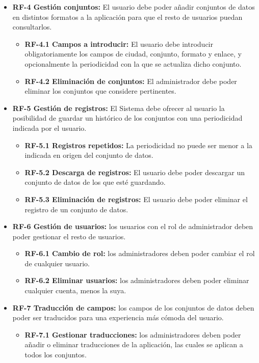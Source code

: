 \begin{itemize}
    \item \textbf{RF-4 Gestión conjuntos:} El usuario debe poder añadir conjuntos de datos en distintos formatos a la aplicación para que el resto de usuarios puedan consultarlos.
    \begin{itemize}
        \item \textbf{RF-4.1 Campos a introducir:} El usuario debe introducir obligatoriamente los campos de ciudad, conjunto, formato y enlace, y opcionalmente la periodicidad con la que se actualiza dicho conjunto.
        \item \textbf{RF-4.2 Eliminación de conjuntos:} El administrador debe poder eliminar los conjuntos que considere pertinentes.
    \end{itemize}

    \item \textbf{RF-5 Gestión de registros:} El Sistema debe ofrecer al usuario la posibilidad de guardar un histórico de los conjuntos con una periodicidad indicada por el usuario.
    \begin{itemize}
        \item \textbf{RF-5.1 Registros repetidos:} La periodicidad no puede ser menor a la indicada en origen del conjunto de datos.
        \item \textbf{RF-5.2 Descarga de registros:} El usuario debe poder descargar un conjunto de datos de los que esté guardando.
        \item \textbf{RF-5.3 Eliminación de registros:} El usuario debe poder eliminar el registro de un conjunto de datos.
    \end{itemize}

    \item \textbf{RF-6 Gestión de usuarios:} los usuarios con el rol de administrador deben poder gestionar el resto de usuarios.
    \begin{itemize}
        \item \textbf{RF-6.1 Cambio de rol:} los administradores deben poder cambiar el rol de cualquier usuario.
        \item \textbf{RF-6.2 Eliminar usuarios:} los administradores deben poder eliminar cualquier cuenta, menos la suya.
    \end{itemize}

    \item \textbf{RF-7 Traducción de campos:} los campos de los conjuntos de datos deben poder ser traducidos para una experiencia más cómoda del usuario.
    \begin{itemize}
        \item \textbf{RF-7.1 Gestionar traducciones:} los administradores deben poder añadir o eliminar traducciones de la aplicación, las cuales se aplican a todos los conjuntos.
    \end{itemize}


\end{itemize}

